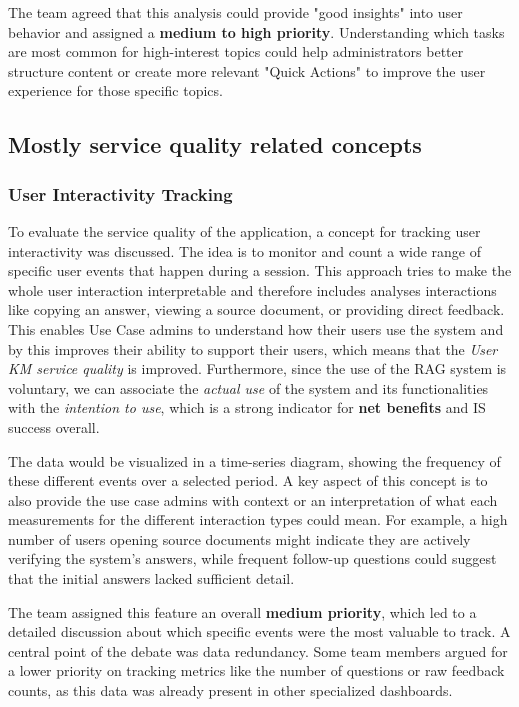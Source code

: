 \documentclass[
	english,
	ruledheaders=section,%
	class=report,%
	thesis={type=bachelor},%
	accentcolor=1b,%
	custommargins=true,%
	marginpar=false,%
	parskip=half-,%
	fontsize=11pt,%
	DIV=14,
]{tudapub}
\begin{document}
The team agreed that this analysis could provide "good insights" into user behavior and assigned a \textbf{medium to high priority}. Understanding which tasks are most common for high-interest topics could help administrators better structure content or create more relevant "Quick Actions" to improve the user experience for those specific topics.
\subsection{Mostly service quality related concepts}
\subsubsection{User Interactivity Tracking}
To evaluate the service quality of the application, a concept for tracking user interactivity was discussed. The idea is to monitor and count a wide range of specific user events that happen during a session. This approach tries to make the whole user interaction interpretable and therefore includes analyses interactions like copying an answer, viewing a source document, or providing direct feedback. This enables Use Case admins to understand how their users use the system and by this improves their ability to support their users, which means that the \textit{User KM service quality} is improved. Furthermore, since the use of the RAG system is voluntary, we can associate the \textit{actual use} of the system and its functionalities with the \textit{intention to use}, which is a strong indicator for \textbf{net benefits} and IS success overall.

The data would be visualized in a time-series diagram, showing the frequency of these different events over a selected period. A key aspect of this concept is to also provide the use case admins with context or an interpretation of what each measurements for the different interaction types could mean. For example, a high number of users opening source documents might indicate they are actively verifying the system's answers, while frequent follow-up questions could suggest that the initial answers lacked sufficient detail.

The team assigned this feature an overall \textbf{medium priority}, which led to a detailed discussion about which specific events were the most valuable to track. A central point of the debate was data redundancy. Some team members argued for a lower priority on tracking metrics like the number of questions or raw feedback counts, as this data was already present in other specialized dashboards.
\end{document}
